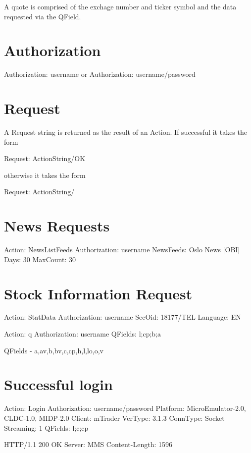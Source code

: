 A quote is comprised of the exchage number and ticker symbol and the data requested via the QField.

\section*{Authorization}
Authorization: username
or
Authorization: username/password

\section*{Request}
A Request string is returned as the result of an Action. If successful it takes the form

Request: ActionString/OK

otherwise it takes the form

Request: ActionString/


\section*{News Requests}
Action: NewsListFeeds
Authorization: username
NewsFeeds: Oslo News [OBI]
Days: 30
MaxCount: 30

\section*{Stock Information Request}
Action: StatData
Authorization: username
SecOid: 18177/TEL
Language: EN

Action: q
Authorization: username
QFields: l;cp;b;a


QFields - a,av,b,bv,c,cp,h,l,lo,o,v

\section*{Successful login}
Action: Login
Authorization: username/password
Platform: MicroEmulator-2.0, CLDC-1.0, MIDP-2.0
Client: mTrader
VerType: 3.1.3
ConnType: Socket
Streaming: 1
QFields: l;c;cp

HTTP/1.1 200 OK
Server: MMS
Content-Length: 1596

